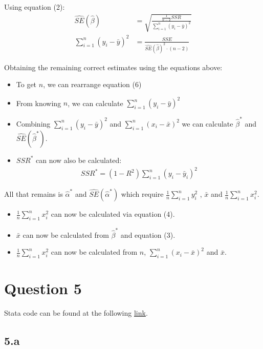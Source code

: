 \documentclass{article}
\begin{document}
Using equation (2):
\begin{align}
    \hat{SE}(\hat{\beta}) 
     &= \sqrt{\frac{\frac{1}{n-2} SSR}{{\sum_{i=1}^{n} (y_{i} - \bar{y})^2}}} \\
     {\sum_{i=1}^{n} (y_{i} - \bar{y})^2}
     &= \frac{SSE}{\hat{SE}(\hat{\beta})^2 \cdot (n-2)}
\end{align}

Obtaining the remaining correct estimates using the equations above:
\begin{itemize}
  \item To get $n$, we can rearrange equation (6)
  \item From knowing $n$, we can calculate ${\sum_{i=1}^{n} (y_{i} - \bar{y})^2}$
  \item Combining ${\sum_{i=1}^{n} (y_{i} - \bar{y})^2}$ and ${\sum_{i=1}^{n} (x_{i} - \bar{x})^2}$ we can calculate $\hat{\beta}^{*}$ and $\hat{SE}(\hat{\beta}^{*})$.
  \item $SSR^{*}$ can now also be calculated:
    \begin{align}
    SSR^{*} = (1 - R^2)\sum_{i=1}^{n}(y_{i} - \bar{y}_{i})^2
    \end{align}
\end{itemize}

All that remains is $\hat{\alpha}^{*}$ and $\hat{SE}(\hat{\alpha}^{*})$ which require $\frac{1}{n} \sum_{i=1}^{n} y_{i}^2$ , $\bar{x}$ and $\frac{1}{n} \sum_{i=1}^{n} x_{i}^2$. 

\begin{itemize}
    \item $\frac{1}{n} \sum_{i=1}^{n} x_{i}^2$ can now be calculated via equation (4).
    \item $\bar{x}$ can now be calculated from $\hat{\beta}^{*}$ and equation (3).
    \item $\frac{1}{n} \sum_{i=1}^{n} x_{i}^2$ can now be calculated from $n$, ${\sum_{i=1}^{n} (x_{i} - \bar{x})^2}$ and $\bar{x}$.
\end{itemize}

\clearpage
\section*{Question 5}

Stata code can be found at the following \href{https://github.com/willhotten/P218-Econometrics/blob/main/Homework%201/HW1_q5.do}{link}.

\subsection*{5.a}
\end{document}
